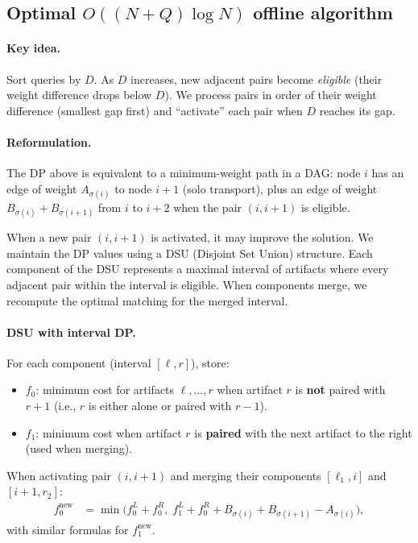 \documentclass[11pt,a4paper]{article}
\begin{document}
\subsection{Optimal $O((N+Q) \log N)$ offline algorithm}

\paragraph{Key idea.}  Sort queries by $D$.  As $D$ increases, new
adjacent pairs become \emph{eligible} (their weight difference drops
below $D$).  We process pairs in order of their weight difference
(smallest gap first) and ``activate'' each pair when $D$ reaches its gap.

\paragraph{Reformulation.}  The DP above is equivalent to a
minimum-weight path in a DAG: node $i$ has an edge of weight $A_{\sigma(i)}$
to node $i{+}1$ (solo transport), plus an edge of weight
$B_{\sigma(i)} + B_{\sigma(i+1)}$ from $i$ to $i{+}2$ when the pair
$(i, i{+}1)$ is eligible.

When a new pair $(i, i{+}1)$ is activated, it may improve the solution.
We maintain the DP values using a DSU (Disjoint Set Union) structure.
Each component of the DSU represents a maximal interval of artifacts
where every adjacent pair within the interval is eligible.  When
components merge, we recompute the optimal matching for the merged
interval.

\paragraph{DSU with interval DP.}
For each component (interval $[\ell, r]$), store:
\begin{itemize}
  \item $f_0$: minimum cost for artifacts $\ell, \ldots, r$ when artifact
        $r$ is \textbf{not} paired with $r{+}1$ (i.e., $r$ is either alone
        or paired with $r{-}1$).
  \item $f_1$: minimum cost when artifact $r$ is \textbf{paired} with
        the next artifact to the right (used when merging).
\end{itemize}

When activating pair $(i, i{+}1)$ and merging their components
$[\ell_1, i]$ and $[i{+}1, r_2]$:
\begin{align*}
  f_0^{\text{new}} &= \min\bigl(
    f_0^{L} + f_0^{R},\;
    f_1^{L} + f_0^{R} + B_{\sigma(i)} + B_{\sigma(i{+}1)} - A_{\sigma(i)}
  \bigr),
\end{align*}
with similar formulas for $f_1^{\text{new}}$.
\end{document}
